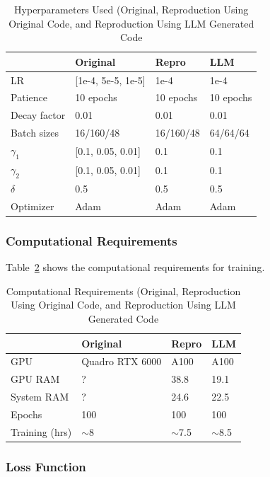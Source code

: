 \documentclass[letterpaper]{article} %
\begin{document}
\begin{table}[h!]
\centering
\begin{tabular}{|l|l|l|l|}
\hline
\textbf{} & \textbf{Original} & \textbf{Repro} & \textbf{LLM} \\
\hline
LR & [1e-4, 5e-5, 1e-5] & 1e-4 & 1e-4 \\
Patience & 10 epochs & 10 epochs & 10 epochs \\
Decay factor & 0.01 & 0.01 & 0.01 \\
Batch sizes & 16/160/48 & 16/160/48 & 64/64/64 \\
$\gamma_1$ & [0.1, 0.05, 0.01] & 0.1 & 0.1 \\
$\gamma_2$ & [0.1, 0.05, 0.01] & 0.1 & 0.1 \\
$\delta$ & 0.5 & 0.5 & 0.5 \\
Optimizer & Adam & Adam & Adam \\
\hline
\end{tabular}
\caption{Hyperparameters Used (Original, Reproduction Using Original Code, and Reproduction Using LLM Generated Code}
\label{tab:hyperparameters}
\end{table}

\subsubsection{Computational Requirements}

Table~\ref{tab:compute} shows the computational requirements for training.

\begin{table}[h!]
\centering
\begin{tabular}{|l|l|l|l|}
\hline
\textbf{} & \textbf{Original} & \textbf{Repro} & \textbf{LLM} \\
\hline
GPU & Quadro RTX 6000 & A100 & A100 \\
GPU RAM & ? & 38.8 & 19.1 \\
System RAM & ? & 24.6 & 22.5 \\
Epochs & 100 & 100 & 100 \\
Training (hrs) & $\sim$8 & $\sim$7.5 & $\sim$8.5 \\
\hline
\end{tabular}
\caption{Computational Requirements (Original, Reproduction Using Original Code, and Reproduction Using LLM Generated Code}
\label{tab:compute}
\end{table}

\subsubsection{Loss Function}
\end{document}
